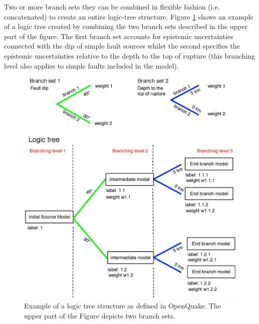 Two or more branch sets they can be combined in flexible fashion (i.e. 
concatenated) to create an entire logic-tree structure.
Figure \ref{fig:logic_tree_schema} shows an example of a logic tree 
created by combining the two branch sets described in the upper part of the
figure. 
The first branch set accounts for epistemic uncertainties connected with 
the dip of simple fault sources whilst the second specifies 
the epistemic uncertainties relative to the depth to the top of rupture  
(this branching level also applies to simple faults included in the model).
\begin{figure}[!h]
\includegraphics[width=15cm]{./Figures/Part_Hazard/logic_tree_schema.eps}
\caption{Example of a logic tree structure as defined in OpenQuake. The upper
part of the Figure depicts two branch sets.}
\label{fig:logic_tree_schema}
\end{figure}
%

